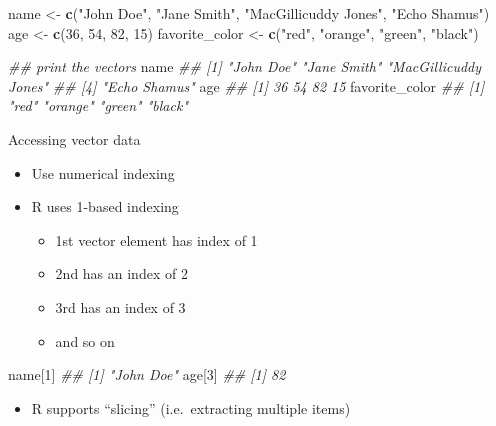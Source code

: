 \documentclass[]{book}
\newenvironment{Shaded}{\begin{snugshade}}{\end{snugshade}}
\newcommand{\CommentTok}[1]{\textcolor[rgb]{0.56,0.35,0.01}{\textit{#1}}}
\newcommand{\DecValTok}[1]{\textcolor[rgb]{0.00,0.00,0.81}{#1}}
\newcommand{\KeywordTok}[1]{\textcolor[rgb]{0.13,0.29,0.53}{\textbf{#1}}}
\newcommand{\NormalTok}[1]{#1}
\newcommand{\StringTok}[1]{\textcolor[rgb]{0.31,0.60,0.02}{#1}}
\providecommand{\tightlist}{%
  \setlength{\itemsep}{0pt}\setlength{\parskip}{0pt}}
\begin{document}
\begin{Shaded}
\begin{Highlighting}[]
\NormalTok{name <-}\StringTok{ }\KeywordTok{c}\NormalTok{(}\StringTok{"John Doe"}\NormalTok{, }\StringTok{"Jane Smith"}\NormalTok{, }\StringTok{"MacGillicuddy Jones"}\NormalTok{, }\StringTok{"Echo Shamus"}\NormalTok{)}
\NormalTok{age <-}\StringTok{ }\KeywordTok{c}\NormalTok{(}\DecValTok{36}\NormalTok{, }\DecValTok{54}\NormalTok{, }\DecValTok{82}\NormalTok{, }\DecValTok{15}\NormalTok{)}
\NormalTok{favorite_color <-}\StringTok{ }\KeywordTok{c}\NormalTok{(}\StringTok{"red"}\NormalTok{, }\StringTok{"orange"}\NormalTok{, }\StringTok{"green"}\NormalTok{, }\StringTok{"black"}\NormalTok{)}

\CommentTok{## print the vectors}
\NormalTok{name}
\CommentTok{## [1] "John Doe"            "Jane Smith"          "MacGillicuddy Jones"}
\CommentTok{## [4] "Echo Shamus"}
\NormalTok{age}
\CommentTok{## [1] 36 54 82 15}
\NormalTok{favorite_color}
\CommentTok{## [1] "red"    "orange" "green"  "black"}
\end{Highlighting}
\end{Shaded}

Accessing vector data

\begin{itemize}
\tightlist
\item
  Use numerical indexing
\item
  R uses 1-based indexing

  \begin{itemize}
  \tightlist
  \item
    1st vector element has index of 1
  \item
    2nd has an index of 2
  \item
    3rd has an index of 3
  \item
    and so on
  \end{itemize}
\end{itemize}

\begin{Shaded}
\begin{Highlighting}[]
\NormalTok{name[}\DecValTok{1}\NormalTok{]}
\CommentTok{## [1] "John Doe"}
\NormalTok{age[}\DecValTok{3}\NormalTok{]}
\CommentTok{## [1] 82}
\end{Highlighting}
\end{Shaded}

\begin{itemize}
\tightlist
\item
  R supports ``slicing'' (i.e.~extracting multiple items)
\end{itemize}
\end{document}
